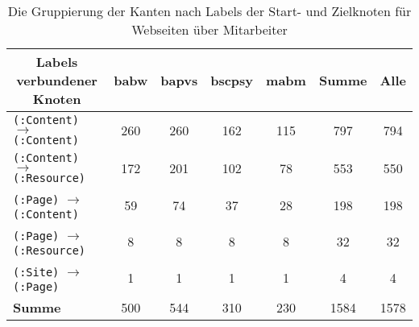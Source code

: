         \begin{table}[!h]
            \centering
            \begin{tabular}{|l|c|c|c|c|c|c|}
                \hline
                \multicolumn{1}{|c|}{\textbf{Labels verbundener Knoten}} & \textbf{\gls{babw}} & \textbf{\gls{bapvs}} & \textbf{\gls{bscpsy}} & \textbf{\gls{mabm}} & \textbf{Summe} & \textbf{Alle} \\ \hline
                \texttt{(:Content)} $\rightarrow$ \texttt{(:Content)}                           & 260           & 260            & 162             & 115           & 797            & 794           \\ \hline
                \texttt{(:Content)} $\rightarrow$ \texttt{(:Resource)}                         & 172           & 201            & 102             & 78            & 553            & 550           \\ \hline
                \texttt{(:Page)} $\rightarrow$ \texttt{(:Content)}                              & 59            & 74             & 37              & 28            & 198            & 198           \\ \hline
                \texttt{(:Page)} $\rightarrow$ \texttt{(:Resource)}                             & 8             & 8              & 8               & 8             & 32             & 32            \\ \hline
                \texttt{(:Site)} $\rightarrow$ \texttt{(:Page)}                                 & 1             & 1              & 1               & 1             & 4              & 4             \\ \hline
                \hline
                \textbf{Summe}                                          & 500           & 544            & 310             & 230           & 1584           & 1578          \\ \hline
            \end{tabular}
            \caption{Die Gruppierung der Kanten nach Labels der Start- und Zielknoten für Webseiten über Mitarbeiter}
            \label{table:findingsTeachersFiguresEdgesByStartEndNodeLabel}
        \end{table}

